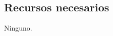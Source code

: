 \documentclass[11pt,letterpaper,titlepage]{article}
\begin{document}
\subsection{Recursos necesarios}
Ninguno.
% 
% 
\end{document}
